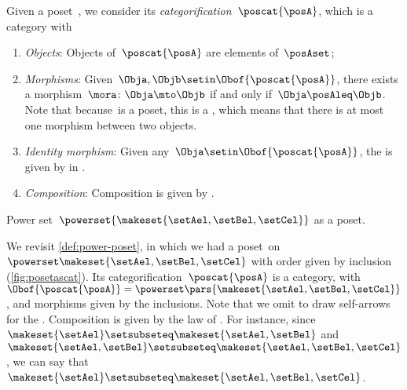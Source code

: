 \begin{ctdefinition}\label{def:poscat}
    Given a poset~\posA, we consider its \emph{categorification}~$\poscat{\posA}$, which is a category with
    \begin{enumerate}
        \item \emph{Objects}: Objects of~$\poscat{\posA}$ are elements of~$\posAset$;
        \item \emph{Morphisms}: Given~$\Obja,\Objb\setin \Obof{\poscat{\posA}}$, there exists a morphism~$\mora\colon \Obja\mto \Objb$ if and only if~$\Obja \posAleq \Objb$.
              Note that because~\posA is a poset, this is a , which means that there is at most one morphism between two objects.
        \item \emph{Identity morphism}: Given any~$\Obja \setin \Obof{\poscat{\posA}}$, the  is given by \emph{} in .
        \item \emph{Composition}: Composition is given by \emph{}.
    \end{enumerate}
\end{ctdefinition}

\begin{marginfigure}
    \centering
    \caption{Power set~$\powerset{\makeset{\setAel,\setBel,\setCel}}$ as a poset. \label{fig:posetascat}}
\end{marginfigure}

\begin{example}
    We revisit \cref{def:power-poset}, in which we had a poset~\posA on $\powerset \makeset{\setAel,\setBel,\setCel}$ with order given by inclusion (\cref{fig:posetascat}).
    Its categorification~$\poscat{\posA}$ is a category, with $\Obof{\poscat{\posA}}=\powerset\pars{\makeset{\setAel,\setBel,\setCel}}$, and morphisms given by the inclusions.
    Note that we omit to draw self-arrows for the .
    Composition is given by the  law of .
    For instance, since~$\makeset{\setAel}\setsubseteq \makeset{\setAel,\setBel}$ and~$\makeset{\setAel,\setBel} \setsubseteq \makeset{\setAel,\setBel,\setCel}$, we can say that~$\makeset{\setAel}\setsubseteq \makeset{\setAel,\setBel,\setCel}$.
\end{example}

